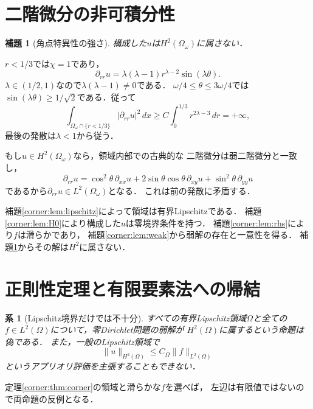 \documentclass[a5paper,10pt,onecolumn]{jsarticle}
\makeatletter
\theoremstyle{mathnotetheorem}
\newtheorem{lemma}[theorem]{補題}
\newtheorem{corollary}[theorem]{系}
\renewcommand{\proofname}{証明}
\renewenvironment{proof}[1][\proofname]{%
  \par\pushQED{\qed}\normalfont\topsep4\p@\@plus2\p@\relax
  \trivlist\item[\hskip\labelsep\bfseries #1]\ignorespaces
}{\popQED\endtrivlist\@endpefalse}
\makeatother
\begin{document}
\section{二階微分の非可積分性}
\begin{lemma}[角点特異性の強さ]\label{corner:lem:notH2}
構成した$u$は$H^2(\Omega_\omega)$に属さない．
\end{lemma}
\begin{proof}
$r<1/3$では$\chi=1$であり，
\[
 \partial_{rr}u
   =\lambda(\lambda-1)r^{\lambda-2}\sin(\lambda\theta).
\]
$\lambda\in(1/2,1)$なので$\lambda(\lambda-1)\ne0$である．
$\omega/4\le\theta\le3\omega/4$では
$\sin(\lambda\theta)\ge1/\sqrt2$である．従って
\[
 \int_{\Omega_\omega\cap\{r<1/3\}}
       |\partial_{rr}u|^2\,dx
 \ge C\int_0^{1/3}r^{2\lambda-3}\,dr=+\infty,
\]
最後の発散は$\lambda<1$から従う．

もし$u\in H^2(\Omega_\omega)$なら，領域内部での古典的な
二階微分は弱二階微分と一致し，
\[
 \partial_{rr}u
 =\cos^2\theta\,\partial_{xx}u
  +2\sin\theta\cos\theta\,\partial_{xy}u
  +\sin^2\theta\,\partial_{yy}u
\]
であるから$\partial_{rr}u\in L^2(\Omega_\omega)$となる．
これは前の発散に矛盾する．
\end{proof}

\begin{proof}[定理\ref{corner:thm:corner}の証明]
補題\ref{corner:lem:lipschitz}によって領域は有界Lipschitzである．
補題\ref{corner:lem:H0}により構成した$u$は零境界条件を持つ．
補題\ref{corner:lem:rhs}により$f$は滑らかであり，
補題\ref{corner:lem:weak}から弱解の存在と一意性を得る．
補題\ref{corner:lem:notH2}からその解は$H^2$に属さない．
\end{proof}

\section{正則性定理と有限要素法への帰結}
\begin{corollary}[Lipschitz境界だけでは不十分]
すべての有界Lipschitz領域$\Omega$と全ての
$f\in L^2(\Omega)$について，零Dirichlet問題の弱解が
$H^2(\Omega)$に属するという命題は偽である．
また，一般のLipschitz領域で
\[
 \|u\|_{H^2(\Omega)}\le C_\Omega\|f\|_{L^2(\Omega)}
\]
というアプリオリ評価を主張することもできない．
\end{corollary}
\begin{proof}
定理\ref{corner:thm:corner}の領域と滑らかな$f$を選べば，
左辺は有限値ではないので両命題の反例となる．
\end{proof}
\end{document}
